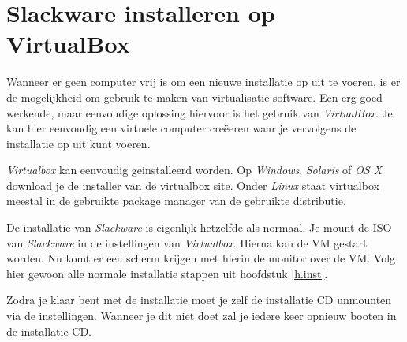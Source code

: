 %
%
%
%

\chapter{Slackware installeren op VirtualBox}\label{app.virtualbox}
Wanneer er geen computer vrij is om een nieuwe installatie op uit te voeren, is er de mogelijkheid om gebruik te maken van virtualisatie software. Een erg goed werkende, maar eenvoudige oplossing hiervoor is het gebruik van \emph{VirtualBox}\cite{bib.vbox}. Je kan hier eenvoudig een virtuele computer cre\"{e}eren waar je vervolgens de installatie op uit kunt voeren.

\emph{Virtualbox} kan eenvoudig geinstalleerd worden. Op \emph{Windows}, \emph{Solaris} of \emph{OS X} download je de installer van de virtualbox site. Onder \emph{Linux} staat virtualbox meestal in de gebruikte package manager van de gebruikte distributie.

De installatie van \emph{Slackware} is eigenlijk hetzelfde als normaal. Je mount de ISO van \emph{Slackware} in de instellingen van \emph{Virtualbox}. Hierna kan de VM gestart worden. Nu komt er een scherm krijgen met hierin de monitor over de VM. Volg hier gewoon alle normale installatie stappen uit hoofdstuk \ref{h.inst}.

Zodra je klaar bent met de installatie moet je zelf de installatie CD unmounten via de instellingen. Wanneer je dit niet doet zal je iedere keer opnieuw booten in de installatie CD.

